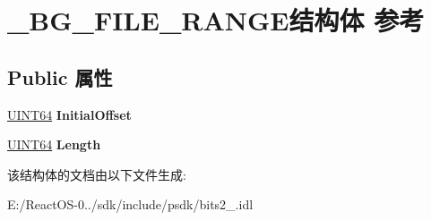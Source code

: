 \hypertarget{struct___b_g___f_i_l_e___r_a_n_g_e}{}\section{\+\_\+\+B\+G\+\_\+\+F\+I\+L\+E\+\_\+\+R\+A\+N\+G\+E结构体 参考}
\label{struct___b_g___f_i_l_e___r_a_n_g_e}
\subsection*{Public 属性}
\begin{DoxyCompactItemize}
\item 
\mbox{\label{struct___b_g___f_i_l_e___r_a_n_g_e_aa1f9f7c5e042e201bc85850989ae624b}} 
\hyperlink{_processor_bind_8h_a57be03562867144161c1bfee95ca8f7c}{U\+I\+N\+T64} {\bfseries Initial\+Offset}
\item 
\mbox{\label{struct___b_g___f_i_l_e___r_a_n_g_e_a20f208764126b06c5c5b21239faf91cf}} 
\hyperlink{_processor_bind_8h_a57be03562867144161c1bfee95ca8f7c}{U\+I\+N\+T64} {\bfseries Length}
\end{DoxyCompactItemize}


该结构体的文档由以下文件生成\+:\begin{DoxyCompactItemize}
\item 
E\+:/\+React\+O\+S-\/0../sdk/include/psdk/bits2\+\_.\+idl\end{DoxyCompactItemize}
